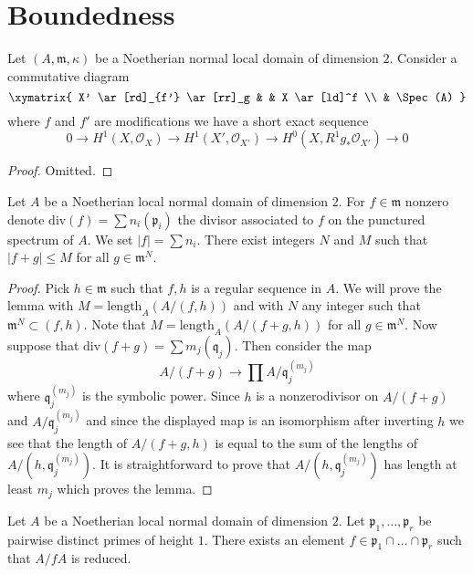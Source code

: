 \section{Boundedness}
\label{section-bounded}


\begin{lemma}
\label{lemma-exact-sequence}
Let $(A, \mathfrak m, \kappa)$ be a Noetherian normal local domain
of dimension $2$. Consider a commutative diagram
$$
\xymatrix{
X' \ar[rd]_{f'} \ar[rr]_g & & X \ar[ld]^f \\
& \Spec(A)
}
$$
where $f$ and $f'$ are modifications we have
a short exact sequence
$$
0 \to H^1(X, \mathcal{O}_X) \to H^1(X', \mathcal{O}_{X'}) \to
H^0(X, R^1g_*\mathcal{O}_{X'}) \to 0
$$
\end{lemma}

\begin{proof}
Omitted.
\end{proof}

\begin{lemma}
\label{lemma-bound-primes}
Let $A$ be a Noetherian local normal domain of dimension $2$.
For $f \in \mathfrak m$ nonzero denote
$\text{div}(f) = \sum n_i (\mathfrak p_i)$
the divisor associated to $f$ on the punctured spectrum of $A$.
We set $|f| = \sum n_i$. There exist integers $N$ and $M$
such that $|f + g| \leq M$ for all $g \in \mathfrak m^N$.
\end{lemma}

\begin{proof}
Pick $h \in \mathfrak m$ such that $f, h$ is a regular sequence in $A$.
We will prove the lemma with $M = \text{length}_A(A/(f, h))$ and with
$N$ any integer such that $\mathfrak m^N \subset (f, h)$. Note that
$M = \text{length}_A(A/(f + g, h))$ for all $g \in \mathfrak m^N$.
Now suppose that $\text{div}(f + g ) = \sum m_j (\mathfrak q_j)$.
Then consider the map
$$
A/(f + g) \longrightarrow \prod A/\mathfrak q_j^{(m_j)}
$$
where $\mathfrak q_j^{(m_j)}$ is the symbolic power. Since $h$ is a
nonzerodivisor on $A/(f + g)$ and $A/\mathfrak q_j^{(m_j)}$ and since
the displayed map is an isomorphism after inverting $h$ we see that
the length of $A/(f + g, h)$ is equal to the sum of the lengths of
$A/(h, \mathfrak q_j^{(m_j)})$. It is straightforward to prove
that $A/(h, \mathfrak q_j^{(m_j)})$ has length at least $m_j$
which proves the lemma.
\end{proof}

\begin{lemma}
\label{lemma-radical-element}
Let $A$ be a Noetherian local normal domain of dimension $2$.
Let $\mathfrak p_1, \ldots, \mathfrak p_r$ be pairwise distinct
primes of height $1$. There exists an element
$f \in \mathfrak p_1 \cap \ldots \cap \mathfrak p_r$ such
that $A/fA$ is reduced.
\end{lemma}

